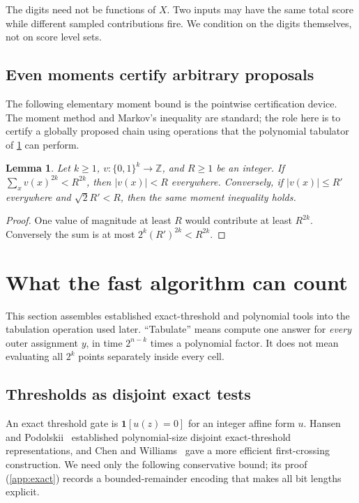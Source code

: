 \documentclass[11pt,letterpaper]{article}
\newtheorem{lemma}[theorem]{Lemma}
\theoremstyle{definition}
\theoremstyle{remark}
\newcommand{\Z}{\mathbb Z}
\newcommand{\ind}{\mathbf 1}
\newcommand{\abs}[1]{\left|#1\right|}
\begin{document}
The digits need not be functions of \(X\). Two inputs may have the
same total score while different sampled contributions fire.
We condition on the digits themselves, not on score level sets.

\subsection{Even moments certify arbitrary proposals}

The following elementary moment bound is the pointwise certification
device. The moment method and Markov's inequality are standard; the
role here is to certify a globally proposed chain using operations
that the polynomial tabulator of \cref{sec:printing} can perform.

\begin{lemma}\label{lem:moment}
Let \(k\ge1\), \(v:\{0,1\}^k\to\Z\), and \(R\ge1\) be an integer.
If \(\sum_xv(x)^{2k}<R^{2k}\), then \(\abs{v(x)}<R\) everywhere.
Conversely, if \(\abs{v(x)}\le R'\) everywhere and
\(\sqrt2R'<R\), then the same moment inequality holds.
\end{lemma}
\begin{proof}
One value of magnitude at least \(R\) would contribute at least
\(R^{2k}\). Conversely the sum is at most \(2^k(R')^{2k}<R^{2k}\).
\end{proof}

\section{What the fast algorithm can count}\label{sec:printing}

This section assembles established exact-threshold and polynomial
tools into the tabulation operation used later. ``Tabulate'' means
compute one answer for \emph{every} outer assignment \(y\), in time
\(2^{n-k}\) times a polynomial factor. It does not mean evaluating
all \(2^k\) points separately inside every cell.

\subsection{Thresholds as disjoint exact tests}

An exact threshold gate is \(\ind[u(z)=0]\) for an integer affine
form \(u\). Hansen and Podolskii~\cite[Theorem~7]{HP10} established polynomial-size
disjoint exact-threshold representations, and Chen and
Williams~\cite[Proposition~18(2) and Appendix~B, Lemmas~48--49]{CW19} gave a more
efficient first-crossing construction. We need only the following
conservative bound; its proof (\cref{app:exact}) records a
bounded-remainder encoding that makes all bit lengths explicit.
\end{document}
